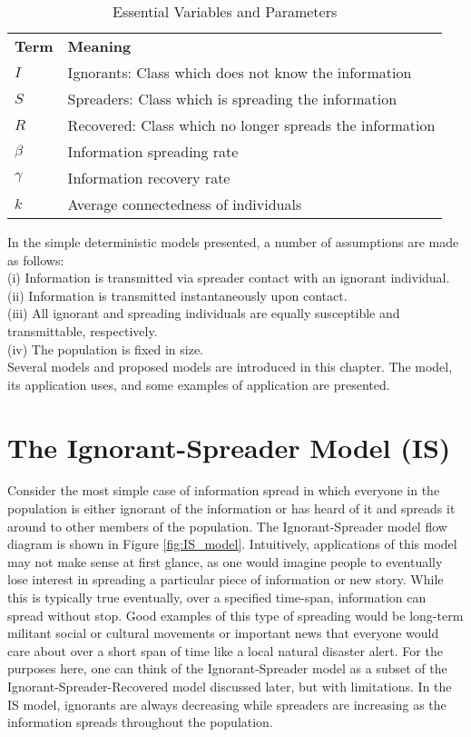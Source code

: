 \begin{table}[!htbp] \centering
\centering
\begin{tabular}{ll}
\textbf{Term}      & \textbf{Meaning}                                   \\
$I$                & Ignorants: Class which does not know the information   \\
$S$                & Spreaders: Class which is spreading the information \\
$R$                & Recovered: Class which no longer spreads the information \\
$\beta$            & Information spreading rate   \\
$\gamma$           & Information recovery rate   \\
$k$                & Average connectedness of individuals \\
\end{tabular}
\caption{Essential Variables and Parameters}
\label{tab:essential_terms}
\end{table}
\noindent In the simple deterministic models presented, a number of assumptions are made as follows:\\
(i)   Information is transmitted via spreader contact with an ignorant individual.\\
(ii)  Information is transmitted instantaneously upon contact.\\
(iii) All ignorant and spreading individuals are equally susceptible and transmittable, respectively.\\
(iv)  The population is fixed in size.\\
Several models and proposed models are introduced in this chapter. The model, its application uses, and some examples of application are presented. %

\section{The Ignorant-Spreader Model (IS)}
Consider the most simple case of information spread in which everyone in the population is either ignorant of the information or has heard of it and spreads it around to other members of the population. The Ignorant-Spreader model flow diagram is shown in Figure \ref{fig:IS_model}. Intuitively, applications of this model may not make sense at first glance, as one would imagine people to eventually lose interest in spreading a particular piece of information or new story. While this is typically true eventually, over a specified time-span, information can spread without stop. Good examples of this type of spreading would be long-term militant social or cultural movements or important news that everyone would care about over a short span of time like a local natural disaster alert. For the purposes here, one can think of the Ignorant-Spreader model as a subset of the Ignorant-Spreader-Recovered model discussed later, but with limitations. 
In the IS model, ignorants are always decreasing while spreaders are increasing as the information spreads throughout the population. 

